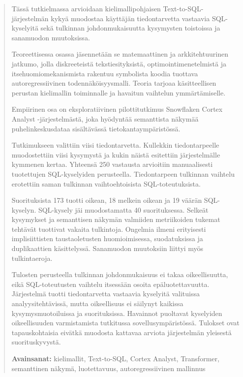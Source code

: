 \begin{abstract}
  \noindent Tässä tutkielmassa arvioidaan kielimallipohjaisen Text-to-SQL-järjestelmän
  kykyä muodostaa käyttäjän tiedontarvetta vastaavia SQL-kyselyitä sekä
  tulkinnan johdonmukaisuutta kysymysten toistoissa ja sanamuodon
  muutoksissa.

  Teoreettisessa osassa jäsennetään se matemaattinen ja arkkitehtuurinen jatkumo, jolla diskreeteistä tekstiesityksistä, optimointimenetelmistä ja itsehuomiomekanismista rakentuu symbolista koodia tuottava autoregressiivinen todennäköisyysmalli. Teoria tarjoaa käsitteellisen perustan kielimallin toiminnalle ja havaitun vaihtelun ymmärtämiselle.

  Empiirinen osa on eksploratiivinen pilottitutkimus Snowflaken
  Cortex Analyst -järjestel\-mästä, joka hyödyntää semanttista näkymää
  puhelinkeskusdataa sisältävässä tietokantaympäristössä.

  Tutkimukseen valittiin viisi tiedontarvetta. Kullekkin tiedontarpeelle muodostettiin viisi kysymystä ja kukin näistä esitettiin järjestelmälle kymmenen kertaa. Yhteensä 250 vastausta arvioitiin manuaalisesti
  tuotettujen SQL-kyselyiden perusteella.
  Tiedontarpeen tulkinnan vaihtelu erotettiin saman tulkinnan
  vaihtoehtoisista SQL-toteutuksista.

  Suorituksista 173 tuotti oikean, 18 melkein oikean ja 19 väärän
  SQL-kyselyn. SQL-kysely jäi muodostamatta 40 suorituksessa. Selkeät
  kysymykset ja semanttisen näkymän valmiiden metriikoiden tukemat tehtävät
  tuottivat vakaita tulkintoja. Ongelmia ilmeni erityisesti implisiittisten
  taustaoletusten huomioimisessa, suodatuksissa ja duplikaattien
  käsittelyssä. Sanamuodon muutoksiin liittyi myös tulkintaeroja.

  Tulosten perusteella tulkinnan johdonmukaisuus ei takaa
  oikeellisuutta, eikä SQL-toteutusten vaihtelu itsessään osoita
  epäluotettavuutta. Järjestelmä tuotti tiedontarvetta vastaavia
  kyselyitä valituissa analyysitehtävissä, mutta oikeellisuus ei
  säilynyt kaikissa kysymysmuotoiluissa ja suorituksissa. Havainnot
  puoltavat kyselyiden oikeellisuuden varmistamista tutkitussa
  sovellusympäristössä. Tulokset ovat tapauskohtaisia eivätkä
  muodosta kattavaa arviota järjestelmän yleisestä suorituskyvystä.

  \vspace{1em}
  \noindent\textbf{Avainsanat:} kielimallit, Text-to-SQL, Cortex Analyst, Transformer, semanttinen näkymä, luotettavuus, autoregressiivinen mallinnus
\end{abstract}
